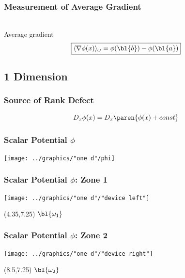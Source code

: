 \documentclass[]{beamer}
\begin{document}
\begin{frame}      %
\frametitle{Measurement of Average Gradient}
	 \\
  Average gradient \\
  $$\boxed{\langle \nabla \phi(x) \rangle_{\omega} = \phi(\bl{b}) - \phi(\bl{a})}$$
\end{frame}

\subsection{1 Dimension}

\begin{frame}      %
\frametitle{Source of Rank Defect}
  $$D_{x} \phi(x) = D_{x} \paren{\phi(x) + const}$$
\end{frame}

\begin{frame}      %
\frametitle{Scalar Potential $\phi$}
  \begin{center}
    \texttt{[image: ../graphics/"one d"/phi]}
  \end{center}
\end{frame}

\begin{frame}      %
\frametitle{Scalar Potential $\phi$: Zone 1}
  \begin{center}
    \texttt{[image: ../graphics/"one d"/"device left"]}
  \end{center}
  \begin{textblock}{2.75}(4.35,7.25)
    $\bl{\omega_{1}}$
  \end{textblock}
\end{frame}

\begin{frame}      %
\frametitle{Scalar Potential $\phi$: Zone 2}
  \begin{center}
    \texttt{[image: ../graphics/"one d"/"device right"]}
  \end{center}
  \begin{textblock}{2.75}(8.5,7.25)
    $\bl{\omega_{2}}$
  \end{textblock}
\end{frame}
\end{document}
